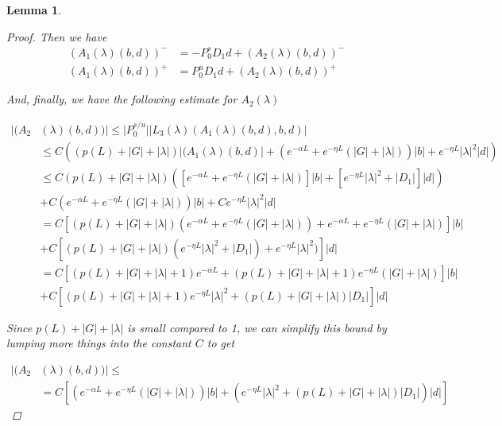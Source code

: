\documentclass[12pt]{article}
\newtheorem{lemma}{Lemma}
\begin{document}
\begin{lemma}
\begin{proof}
Then we have
\begin{align*}
(A_1(\lambda)(b,d))^- &= -P_0^s D_1 d + (A_2(\lambda)(b,d))^-\\
(A_1(\lambda)(b,d))^+ &= P_0^u D_1 d + (A_2(\lambda)(b,d))^+
\end{align*}

And, finally, we have the following estimate for $A_2(\lambda)$

\begin{align*}
|(A_2&(\lambda)(b,d))| \leq |P_0^{s/u}|| L_3(\lambda)(A_1(\lambda)(b,d),b,d) |\\
&\leq C \left( \left( p(L) + |G| + |\lambda|\right) |(A_1(\lambda)(b,d)| + \left( e^{-\alpha L} + e^{-\eta L} \left(|G| + |\lambda|\right) \right) |b| + e^{-\eta L} |\lambda|^2 |d| \right)\\
&\leq C \left( p(L) + |G| + |\lambda|\right) \left( \left[e^{-\alpha L} + e^{-\eta L} \left(|G| + |\lambda|\right) \right]|b| + \left[ e^{-\eta L} |\lambda|^2 + |D_1| \right] |d| \right) \\
&+ C\left( e^{-\alpha L} + e^{-\eta L} \left(|G| + |\lambda|\right) \right) |b| + C e^{-\eta L} |\lambda|^2 |d| \\
&= C \left[ \left( p(L) + |G| + |\lambda| \right) \left( e^{-\alpha L} + e^{-\eta L} \left(|G| + |\lambda|\right)\right) +  e^{-\alpha L} + e^{-\eta L} \left(|G| + |\lambda|\right) \right] |b| \\
&+ C \left[  \left( p(L) + |G| + |\lambda| \right)(e^{-\eta L} |\lambda|^2 + |D_1|) + e^{-\eta L} |\lambda|^2) \right]|d| \\
&= C \left[ \left( p(L) + |G| + |\lambda| + 1 \right) e^{-\alpha L} + \left( p(L) + |G| + |\lambda| + 1 \right) e^{-\eta L} \left(|G| + |\lambda|\right)\right] |b| \\
&+ C \left[ \left( p(L) + |G| + |\lambda| + 1 \right)e^{-\eta L} |\lambda|^2 + \left( p(L) + |G| + |\lambda| \right)|D_1| \right]|d| 
\end{align*}

Since $p(L) + |G| + |\lambda|$ is small compared to 1, we can simplify this bound by lumping more things into the constant $C$ to get

\begin{align*}
|(A_2&(\lambda)(b,d))| \leq \\
&= C \left[ \left( e^{-\alpha L} + e^{-\eta L} \left(|G| + |\lambda|\right)\right) |b|
+ \left( e^{-\eta L} |\lambda|^2 + \left( p(L) + |G| + |\lambda| \right)|D_1| \right)|d| \right]
\end{align*}

\end{proof}
\end{lemma}
\end{document}
